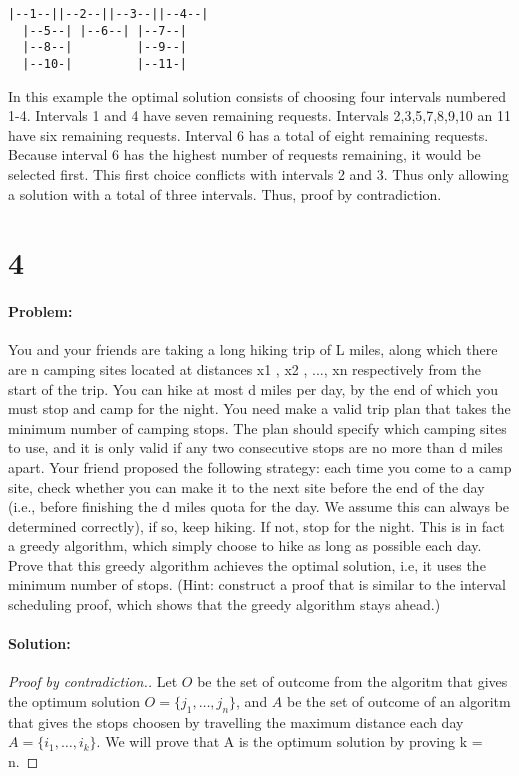 \documentclass[12pt]{article}
\begin{document}
\begin{verbatim}
|--1--||--2--||--3--||--4--|
  |--5--| |--6--| |--7--|
  |--8--|         |--9--|
  |--10-|         |--11-|
\end{verbatim}

In this example the optimal solution consists of choosing four intervals
numbered 1-4.  Intervals 1 and 4 have seven remaining requests.
Intervals 2,3,5,7,8,9,10 an 11 have six remaining requests.  Interval 6
has a total of eight remaining requests.  Because interval 6 has the
highest number of requests remaining, it would be selected first.  This
first choice conflicts with intervals 2 and 3.  Thus only allowing a
solution with a total of three intervals.  Thus, proof by contradiction.

\section*{4}
\paragraph{Problem:}
You and your friends are taking a long hiking trip of L miles, along
which there are n camping sites located at distances x1 , x2 , ..., xn
respectively from the start of the trip. You can hike at most d miles
per day, by the end of which you must stop and camp for the night. You
need make a valid trip plan that takes the minimum number of camping
stops. The plan should specify which camping sites to use, and it is
only valid if any two consecutive stops are no more than d miles apart.
Your friend proposed the following strategy: each time you come to a
camp site, check whether you can make it to the next site before the end
of the day (i.e., before finishing the d miles quota for the day. We
assume this can always be determined correctly), if so, keep hiking. If
not, stop for the night.  This is in fact a greedy algorithm, which
simply choose to hike as long as possible each day. Prove that this
greedy algorithm achieves the optimal solution, i.e, it uses the minimum
number of stops. (Hint: construct a proof that is similar to the
interval scheduling proof, which shows that the greedy algorithm stays
ahead.)

\paragraph{Solution:}
\begin{proof}[Proof by contradiction.]

Let $O$ be the set of outcome from the algoritm that gives the optimum solution $O =
\{j_1,\dots,j_n\}$, and $A$ be the set of outcome of an algoritm that
gives the stops choosen by travelling the maximum distance each day $A =
\{i_1,\dots,i_k\}$. We will prove that A is the optimum solution by
proving k = n.



\end{proof}
\end{document}

